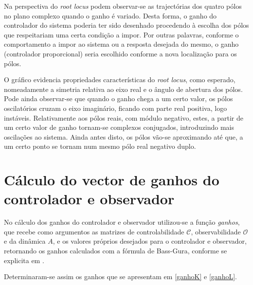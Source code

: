 \documentclass[%
  reprint,
  nofootinbib,
  amsmath,amssymb,
  aps,
  10pt,
  a4paper
]{revtex4-1}
\begin{document}

\par Na perspectiva do \textit{root locus} podem observar-se as trajectórias dos quatro pólos no plano complexo quando o ganho é variado. Desta forma, o ganho do controlador do sistema poderia ter sido desenhado procedendo à escolha dos pólos que respeitariam uma certa condição a impor. Por outras palavras, conforme o comportamento a impor ao sistema ou a resposta desejada do mesmo, o ganho (controlador proporcional) seria escolhido conforme a nova localização para os pólos.
\par O gráfico evidencia propriedades características do \textit{root locus}, como esperado, nomeadamente a simetria relativa ao eixo real e o ângulo de abertura dos pólos. Pode ainda observar-se que quando o ganho chega a um certo valor, os pólos oscilatórios cruzam o eixo imaginário, ficando com parte real positiva, logo instáveis. Relativamente aos pólos reais, com módulo negativo, estes, a partir de um certo valor de ganho tornam-se complexos conjugados, introduzindo mais oscilações ao sistema. Ainda antes disto, os pólos vão-se aproximando até que, a um certo ponto se tornam num mesmo pólo real negativo duplo.


\section{Cálculo do vector de ganhos do controlador e observador}
No cálculo dos ganhos do controlador e observador utilizou-se a função {\it ganhos}, que recebe como argumentos as matrizes de controlabilidade $\mathcal{C}$, observabilidade $\mathcal{O}$ e da dinâmica $A$, e os valores próprios desejados para o controlador e observador, retornando os ganhos calculados com a fórmula de Bass-Gura, conforme se explicita em .

Determinaram-se assim os ganhos que se apresentam em \eqref{ganhoK} e \eqref{ganhoL}.

\end{document}
